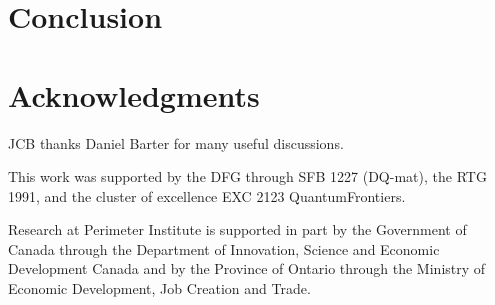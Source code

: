 \section{Conclusion}

\section*{Acknowledgments}
JCB thanks Daniel Barter for many useful discussions.

This work was supported by the DFG through SFB 1227 (DQ-mat), the RTG 1991, and the cluster of excellence EXC 2123 QuantumFrontiers.

Research at Perimeter Institute is supported in part by the Government of Canada through the Department of Innovation, Science and Economic Development Canada and by the Province of Ontario through the Ministry of Economic Development, Job Creation and Trade.



